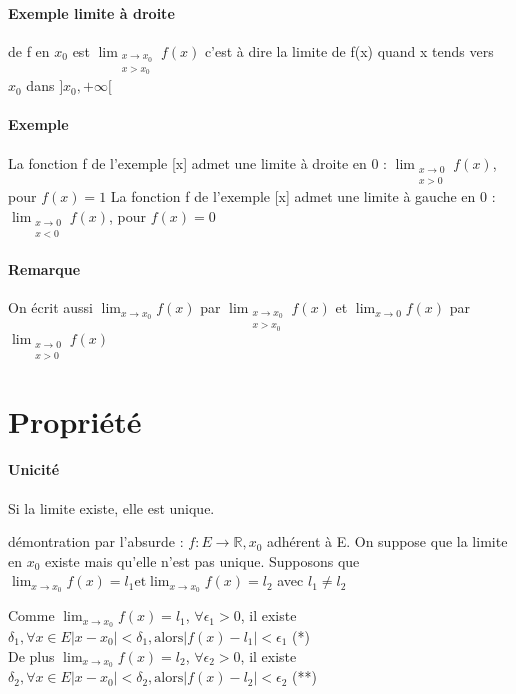 \paragraph{Exemple limite à droite} de f en $x_0$ est $\lim_{\substack{x \to x_0 \\ x > x_0}} f(x)$ c'est à dire la limite de f(x) quand x tends vers $x_0$ dans $]x_0, +\infty[$

\paragraph{Exemple}
La fonction f de l'exemple [x] admet une limite à droite en 0 : $\lim_{\substack{x \to 0 \\ x > 0}} f(x)$, pour $f(x) = 1$
La fonction f de l'exemple [x] admet une limite à gauche en 0 : $\lim_{\substack{x \to 0 \\ x < 0}} f(x)$, pour $f(x) = 0$

\paragraph{Remarque} On écrit aussi $\lim_{x \to x_0} f(x)$ par $\lim_{\substack{x \to x_0 \\ x > x_0}} f(x)$ et $\lim_{x \to 0} f(x)$ par $\lim_{\substack{x \to 0 \\ x > 0}} f(x)$

\section{Propriété}
\paragraph{Unicité} Si la limite existe, elle est unique.

démontration par l'absurde : $f : E \rightarrow \mathbb{R}, x_0$ adhérent à E. On suppose que la limite en $x_0$ existe mais qu'elle n'est pas unique.
Supposons que $\lim_{x \to x_0} f(x) = l_1 \text{et} \lim_{x \to x_0} f(x) = l_2$ avec $l_1 \neq l_2$

Comme $\lim_{x \to x_0} f(x) = l_1$, $\forall \epsilon_1 > 0$, il existe $\delta_1, \forall x \in E |x-x_0|< \delta_1, \text{alors} |f(x) - l_1| < \epsilon_1$ (*)
~\\
De plus $\lim_{x \to x_0} f(x) = l_2$, $\forall \epsilon_2 > 0$, il existe $\delta_2, \forall x \in E |x-x_0|< \delta_2, \text{alors} |f(x) - l_2| < \epsilon_2$ (**)
~\\


